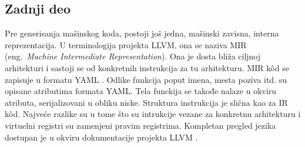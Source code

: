 \documentclass[12pt,oneside]{memoir}
\begin{document}
\subsection{Zadnji deo}


Pre generisanja mašinskog koda, postoji još jedna, mašinski zavisna, interna reprezentacija.
U terminologija projekta LLVM, ona se naziva MIR (eng.~{\em Machine Intermediate Representation}).
Ona je dosta bliža ciljnoj arhitekturi i sastoji se od konkretnih instrukcija za tu arhitekturu.
MIR k\^od se zapisuje u formatu YAML \cite{yaml}.
Odlike funkcija poput imena, mesta poziva itd. su opisane atributima formata YAML.
Tela funckija se takođe nalaze u okviru atributa, serijalizovani u obliku niske.
Struktura instrukcija je slična kao za IR k\^od.
Najveće razlike su u tome što su intrukcije vezane za konkretnu arhitekturu i virtuelni registri su zamenjeni pravim registrima.
Kompletan pregled jezika dostupan je u okviru dokumentacije projekta LLVM \cite{mirlangref}.
\end{document}
